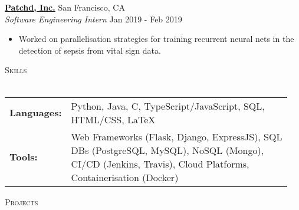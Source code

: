 \documentclass[a4paper]{article}
\newcommand{\lineunder} {
    \vspace*{-8pt} \\
    \hspace*{-10pt} \hrulefill \\
}
\newcommand{\header} [1] {
    {\hspace*{-10pt}\vspace*{6pt} \textsc{#1}}
    \vspace*{-6pt} \lineunder
}
\newenvironment{myitemize}
{   \small
    \vspace{-2pt}
    \begin{itemize}
    \setlength{\itemsep}{0pt}
    \setlength{\parskip}{0pt}
    \setlength{\parsep}{0pt}     }
{ \end{itemize}                  }
\begin{document}
\vspace{-0.5mm}

\textbf{\href{https://www.patchdmedical.com/}{Patchd, Inc.}} \hfill San Francisco, CA\\
\textit{Software Engineering Intern} \hfill  Jan 2019 - Feb 2019\\
\begin{myitemize} \itemsep 0.5mm
	\item Worked on parallelisation strategies for training recurrent neural nets in the detection of sepsis from vital sign data.
\end{myitemize}


\vspace{-0.5mm}
\header{Skills}
\vspace{1mm}
\begin{tabular}{p{0.12\linewidth}p{0.83\linewidth}}
	\textbf{Languages:} & Python, Java, C, TypeScript/JavaScript, SQL, HTML/CSS, \LaTeX \\
	\textbf{Tools:} & Web Frameworks (Flask, Django, ExpressJS), SQL DBs (PostgreSQL, MySQL), NoSQL (Mongo), CI/CD (Jenkins, Travis), Cloud Platforms, Containerisation (Docker)
\end{tabular}

\vspace{mm}

\header{Projects}
\end{document}
